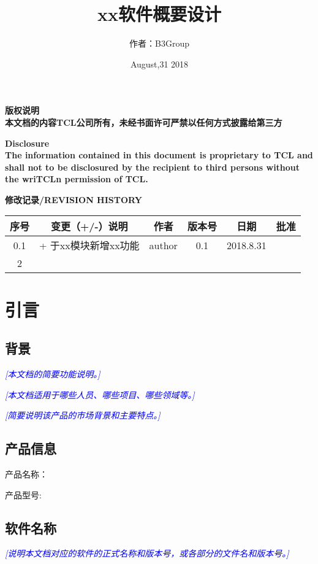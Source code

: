 \documentclass[UTF8]{ctexart}
\title{xx软件概要设计}
\author{作者：B3Group}
\date{August,31 2018}
\newcommand{\note}[1]{\textcolor{blue}{\emph{[#1]}}}   %
\newcommand{\pnote}[1]{\par{\textcolor{blue}{\emph{[#1]}}}}   %
\begin{document}
\maketitle
\thispagestyle{empty}
\newpage%
\setcounter{page}{1}
\begin{center}
 \vspace{20ex}
 \par{\textbf{版权说明\\本文档的内容TCL公司所有，未经书面许可严禁以任何方式披露给第三方}}
 \par{\textbf{Disclosure\\The information contained in this document is proprietary to TCL and shall
      not to be disclosured by the recipient to third persons without the wriTCLn permission of TCL.}}
 \vspace{2ex}
 \par{\textbf{修改记录/REVISION HISTORY}}
 \vspace{2ex}
 \par{}
 \begin{tabular}{|c|c|c|c|c|c|}
   \hline
    序号 & 变更（+/-）说明 & 作者 & 版本号 & 日期 & 批准 \\
    \hline
    0.1 & + 于xx模块新增xx功能 & author & 0.1 & 2018.8.31 &\\
    \hline
    2 & & & & &\\
    \hline
  \end{tabular}
\end{center}
 \newpage
 \tableofcontents%
 \newpage
 \section{引言} %
   \subsection{背景}
   \note{本文档的简要功能说明。}
   \pnote{本文档适用于哪些人员、哪些项目、哪些领域等。}
   \pnote{简要说明该产品的市场背景和主要特点。}
    \subsection{产品信息}产品名称：
     \par{产品型号:}
    \subsection{软件名称}
    \note{说明本文档对应的软件的正式名称和版本号，或各部分的文件名和版本号。}
\end{document}
